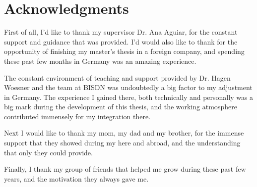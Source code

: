 \chapter*{Acknowledgments}

First of all, I'd like to thank my supervisor Dr. Ana Aguiar, for the constant support and guidance that was provided. I'd would also like to thank for the 
opportunity of finishing my master's thesis in a foreign company, and spending these past few months in Germany was an amazing experience.

\par The constant environment of teaching and support provided by Dr. Hagen Woesner and the team at BISDN was undoubtedly a big factor to my adjustment in Germany.
The experience I gained there, both technically and personally was a big mark during the development of this thesis, and the working atmosphere contributed immensely
for my integration there.

\par Next I would like to thank my mom, my dad and my brother, for the immense support that they showed during my here and abroad, and the understanding that only
they could provide.

\par Finally, I thank my group of friends that helped me grow during these past few years, and the motivation they always gave me.

\vspace{10mm}
